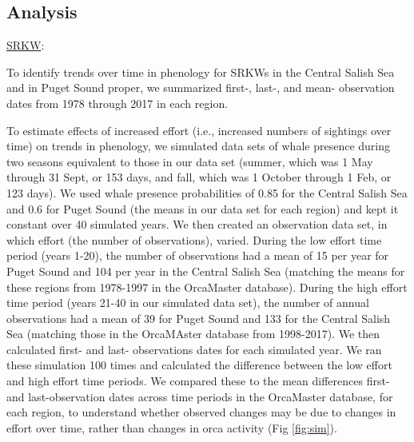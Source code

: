 \documentclass{article}
\begin{document}
\subsection* {Analysis}
\underline{SRKW}:
\par To identify trends over time in phenology for SRKWs in the Central Salish Sea and in Puget Sound proper, we summarized first-, last-, and mean- observation dates from 1978 through 2017 in each region. %
\par  To estimate effects of increased effort (i.e., increased numbers of sightings over time) on trends in phenology, we simulated data sets of whale presence during two seasons equivalent to those in our data set (summer, which was 1 May through 31 Sept, or 153 days, and fall, which was 1 October through 1 Feb, or 123 days). We used whale presence probabilities of 0.85 for the Central Salish Sea and 0.6 for Puget Sound (the means in our data set for each region) and kept it constant over 40 simulated years. We then created an observation data set, in which effort (the number of observations), varied. During the low effort time period (years 1-20), the number of observations had a mean of 15 per year for Puget Sound and 104 per year in the Central Salish Sea (matching the means for these regions from 1978-1997 in the OrcaMaster database).  During the high effort time period (years 21-40 in our simulated data set), the number of annual observations had a mean of 39 for Puget Sound and 133 for the Central Salish Sea (matching those in the OrcaMAster database from 1998-2017). We then calculated first- and last- observations dates for each simulated year. We ran these simulation 100 times and calculated the difference between the low effort and high effort time periods. We compared these to the mean differences first- and last-observation dates across time periods in the OrcaMaster database, for each region, to understand whether observed changes may be due to changes in effort over time, rather than changes in orca activity (Fig \ref{fig:sim}).
\end{document}
